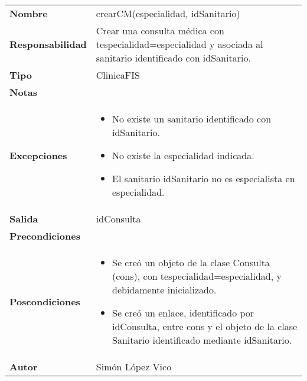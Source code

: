 \documentclass[11pt,a4paper]{article}
\newenvironment{itemizenomargins}
    {\begin{minipage}[t]{1\linewidth}\begin{itemize}}
    {\end{itemize}\end{minipage}}
\begin{document}
\begin{table}[H]
	\centering
	\label{my-label}
	\begin{tabularx}{\textwidth}{l|X}
		\textbf{Nombre}          & crearCM(especialidad, idSanitario) \\
		\textbf{Responsabilidad} & Crear una consulta médica con tespecialidad=especialidad y asociada al sanitario identificado con idSanitario. \\
		\textbf{Tipo}            & ClinicaFIS \\
		\textbf{Notas}           & \\
		\textbf{Excepciones}     &
		\begin{itemizenomargins}
			\item No existe un sanitario identificado con idSanitario.
			\item No existe la especialidad indicada.
			\item El sanitario idSanitario no es especialista en especialidad.
		\end{itemizenomargins} \\
		\textbf{Salida}          & idConsulta \\
		\textbf{Precondiciones}  & \\
		\textbf{Poscondiciones}  & 
		\begin{itemizenomargins}
			\item Se creó un objeto de la clase Consulta (cons), con tespecialidad=especialidad, y debidamente inicializado.
			\item Se creó un enlace, identificado por idConsulta, entre cons y el objeto de la clase Sanitario identificado mediante idSanitario.
			
		\end{itemizenomargins} \\
		\textbf{Autor}			 & Simón López Vico
	\end{tabularx}
\end{table}
\end{document}
